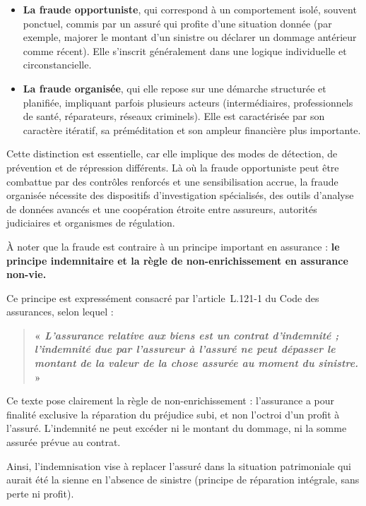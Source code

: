\begin{itemize}[label= $\bullet$]
    \item \textbf{La fraude opportuniste}, qui correspond à un comportement isolé, souvent ponctuel, commis par un assuré qui profite d'une situation donnée (par exemple, majorer le montant d'un sinistre ou déclarer un dommage antérieur comme récent). Elle s'inscrit généralement dans une logique individuelle et circonstancielle.
    \item \textbf{La fraude organisée}, qui elle repose sur une démarche structurée et planifiée, impliquant parfois plusieurs acteurs (intermédiaires, professionnels de santé, réparateurs, réseaux criminels). Elle est caractérisée par son caractère itératif, sa préméditation et son ampleur financière plus importante.
\end{itemize}

Cette distinction est essentielle, car elle implique des modes de détection, de prévention et de répression différents. Là où la fraude opportuniste peut être combattue par des contrôles renforcés et une sensibilisation accrue, la fraude organisée nécessite des dispositifs d'investigation spécialisés, des outils d'analyse de données avancés et une coopération étroite entre assureurs, autorités judiciaires et organismes de régulation.

À noter que la fraude est contraire à un principe important en assurance : \textbf{le principe indemnitaire et la règle de non-enrichissement en assurance non-vie.}

Ce principe est expressément consacré par l'article~L.121-1 du Code des assurances, selon lequel :

\begin{quote}
\textbf{« \textit{L'assurance relative aux biens est un contrat d'indemnité ; l'indemnité due par l'assureur à l'assuré ne peut dépasser le montant de la valeur de la chose assurée au moment du sinistre.} »}
\end{quote}

Ce texte pose clairement la règle de non-enrichissement : l'assurance a pour finalité exclusive la réparation du préjudice subi, et non l'octroi d'un profit à l'assuré. L'indemnité ne peut excéder ni le montant du dommage, ni la somme assurée prévue au contrat.

Ainsi, l'indemnisation vise à replacer l'assuré dans la situation patrimoniale qui aurait été la sienne en l'absence de sinistre (principe de réparation intégrale, sans perte ni profit).

